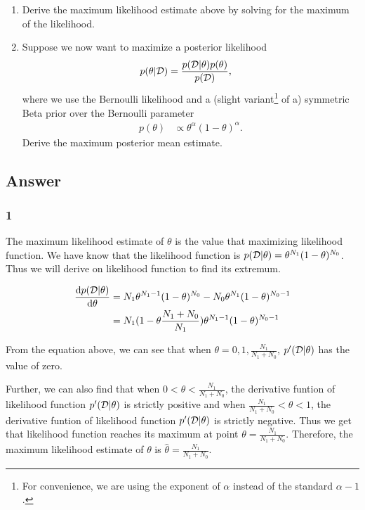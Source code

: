 \documentclass[10pt]{article}
\begin{document}
	\begin{enumerate}
		
		\item Derive the maximum likelihood estimate above by solving for the maximum of the likelihood.
		
		\item Suppose we now want to maximize a posterior likelihood
		\begin{align}
		p(\theta | {\cal D}) &= \frac{p({\cal D} | \theta) p(\theta)}{p({\cal D})},
		\end{align}
		where we use the Bernoulli likelihood and a (slight variant\footnote{For convenience, we are using the exponent of $\alpha$ instead of the standard $\alpha-1$.} of a) symmetric Beta prior over the Bernoulli parameter
		\begin{align}
		p(\theta) &\propto \theta^{\alpha} (1 - \theta)^{\alpha}.
		\end{align}
		Derive the maximum posterior mean estimate.
		
	\end{enumerate}



	\subsection{Answer}
	\subsubsection{1}
		The maximum likelihood estimate of $\theta$ is the value that maximizing likelihood function. We have know that the likelihood function is $p({\cal D} | \theta) = \theta^{N_1} (1-\theta)^{N_0}$. Thus we will derive on likelihood function to find its extremum.
		
		\begin{equation}
		\begin{aligned}
			\frac{\mathrm{d}p({\cal D} | \theta)}{\mathrm{d}\theta}&=N_1 \theta^{N_1-1}(1-\theta)^{N_0}-N_0 \theta^{N_1} (1-\theta)^{N_0-1} \\
			&=N_1 (1-\theta \frac{N_1+N_0}{N_1})\theta^{N_1-1}(1-\theta)^{N_0-1}
		\end{aligned}
		\end{equation}
		\par
		From the equation above, we can see that when $\theta=0, 1, \frac{N_1}{N_1+N_0}$, $p'({\cal D} | \theta)$ has the value of zero.\par
		Further, we can also find that when $0<\theta<\frac{N_1}{N_1+N_0}$, the derivative funtion of likelihood function $p'({\cal D} | \theta)$ is strictly positive and when $\frac{N_1}{N_1+N_0}<\theta<1$, the derivative funtion of likelihood function $p'({\cal D} | \theta)$ is strictly negative. Thus we get that likelihood function reaches its maximum at point $\theta=\frac{N_1}{N_1+N_0}$. 
		Therefore, the maximum likelihood estimate of $\theta$ is $\hat{\theta}=\frac{N_1}{N_1+N_0}$.
		 
\end{document}
